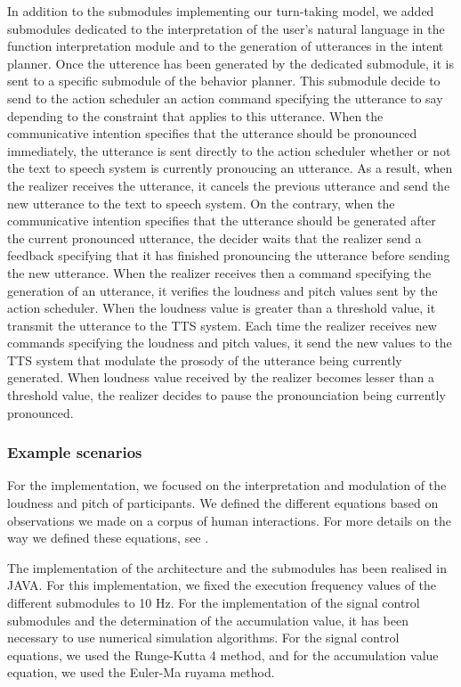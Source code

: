 In addition to the submodules implementing our turn-taking model, we added submodules dedicated to the interpretation of the user's natural language in the function interpretation module and to the generation of utterances in the intent planner. 
Once the utterence has been generated by the dedicated submodule, it is sent to a specific submodule of the behavior planner. This submodule decide to send to the action scheduler an action command specifying the utterance to say depending to the constraint that applies to this utterance. When the communicative intention specifies that the utterance should be pronounced immediately, the utterance is sent directly to the action scheduler whether or not the text to speech system is currently pronoucing an utterance. As a result, when the realizer receives the utterance, it cancels the previous utterance and send the new utterance to the text to speech system. On the contrary, when the communicative intention specifies that the utterance should be generated after the current pronounced utterance, the decider waits that the realizer send a feedback specifying that it has finished pronouncing the utterance before sending the new utterance. 
When the realizer receives then a command specifying the generation of an utterance, it verifies the loudness and pitch values sent by the action scheduler. When the loudness value is greater than a threshold value, it transmit the utterance  to the TTS system. Each time the realizer receives new commands specifying the loudness and pitch values, it send the new values to the TTS system that modulate the prosody of the utterance being currently generated. When loudness value received by the realizer becomes lesser than a threshold value, the realizer decides to pause the pronounciation being currently pronounced. 

\subsubsection{Example scenarios}

For the implementation, we focused on the interpretation and modulation of the loudness and pitch of participants. We defined the different equations based on observations we made on a corpus of human interactions. For more details on the way we defined these equations, see \cite{jegou_continuous_2015}.

The implementation of the architecture and the submodules has been realised in JAVA. For this implementation, we fixed the execution frequency values of the different submodules to 10 Hz. For the implementation of the signal control submodules and the determination of the accumulation value, it has been necessary to use numerical simulation algorithms. For the signal control equations, we used the Runge-Kutta 4 method, and for the accumulation value equation, we used the Euler-Ma ruyama method. 

